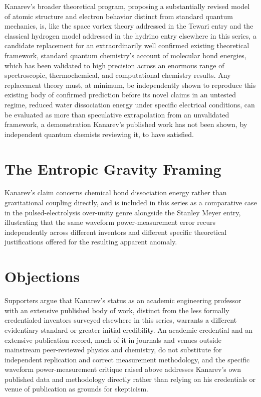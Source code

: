 \documentclass[11pt]{article}
\begin{document}
Kanarev's broader theoretical program, proposing a substantially revised model of atomic structure and electron behavior distinct from standard quantum mechanics, is, like the space vortex theory addressed in the Tewari entry and the classical hydrogen model addressed in the hydrino entry elsewhere in this series, a candidate replacement for an extraordinarily well confirmed existing theoretical framework, standard quantum chemistry's account of molecular bond energies, which has been validated to high precision across an enormous range of spectroscopic, thermochemical, and computational chemistry results. Any replacement theory must, at minimum, be independently shown to reproduce this existing body of confirmed prediction before its novel claims in an untested regime, reduced water dissociation energy under specific electrical conditions, can be evaluated as more than speculative extrapolation from an unvalidated framework, a demonstration Kanarev's published work has not been shown, by independent quantum chemists reviewing it, to have satisfied.

\section{The Entropic Gravity Framing}

Kanarev's claim concerns chemical bond dissociation energy rather than gravitational coupling directly, and is included in this series as a comparative case in the pulsed-electrolysis over-unity genre alongside the Stanley Meyer entry, illustrating that the same waveform power-measurement error recurs independently across different inventors and different specific theoretical justifications offered for the resulting apparent anomaly.

\section{Objections}

Supporters argue that Kanarev's status as an academic engineering professor with an extensive published body of work, distinct from the less formally credentialed inventors surveyed elsewhere in this series, warrants a different evidentiary standard or greater initial credibility. An academic credential and an extensive publication record, much of it in journals and venues outside mainstream peer-reviewed physics and chemistry, do not substitute for independent replication and correct measurement methodology, and the specific waveform power-measurement critique raised above addresses Kanarev's own published data and methodology directly rather than relying on his credentials or venue of publication as grounds for skepticism.
\end{document}
